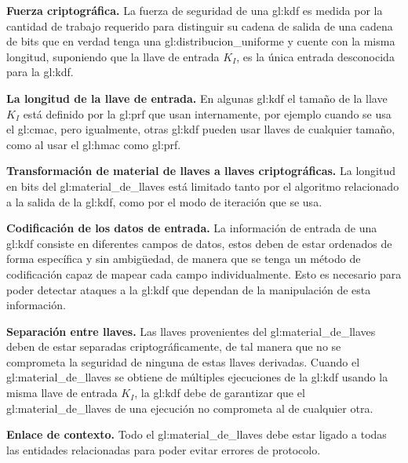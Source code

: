 \textbf{Fuerza criptográfica.}
La fuerza de seguridad de una \gls{gl:kdf} es medida por la cantidad de 
trabajo requerido para distinguir su cadena de salida de una cadena de bits 
que en verdad tenga una \gls{gl:distribucion_uniforme} y cuente con la misma 
longitud, suponiendo que la llave de entrada $K_I$, es la única entrada 
desconocida para la \gls{gl:kdf}.

\textbf{La longitud de la llave de entrada.}
En algunas \gls{gl:kdf} el tamaño de la llave $K_I$ está definido por la 
\gls{gl:prf} que usan internamente, por ejemplo cuando se usa el \gls{gl:cmac}, 
pero igualmente, otras \gls{gl:kdf} pueden usar llaves de cualquier tamaño, 
como al usar el \gls{gl:hmac} como \gls{gl:prf}.

\textbf{Transformación de material de llaves a llaves criptográficas.}
La longitud en bits del \gls{gl:material_de_llaves} está limitado tanto por 
el algoritmo relacionado a la salida de la \gls{gl:kdf}, como por el modo de 
iteración que se usa.

\textbf{Codificación de los datos de entrada.}
La información de entrada de una \gls{gl:kdf} consiste en diferentes campos 
de datos, estos deben de estar ordenados de forma específica y sin ambigüedad, 
de manera que se tenga un método de codificación capaz de mapear cada campo 
individualmente. Esto es necesario para poder detectar ataques a la 
\gls{gl:kdf} que dependan de la manipulación de esta información.

\textbf{Separación entre llaves.}
Las llaves provenientes del \gls{gl:material_de_llaves} deben de estar 
separadas criptográficamente, de tal manera que no se comprometa la seguridad 
de ninguna de estas llaves derivadas. Cuando el \gls{gl:material_de_llaves} 
se obtiene de múltiples ejecuciones de la \gls{gl:kdf} usando la misma llave 
de entrada $K_I$, la \gls{gl:kdf} debe de garantizar que el 
\gls{gl:material_de_llaves} de una ejecución no comprometa al de cualquier 
otra.

\textbf{Enlace de contexto.}
Todo el \gls{gl:material_de_llaves} debe estar ligado a todas las entidades 
relacionadas para poder evitar errores de protocolo.

